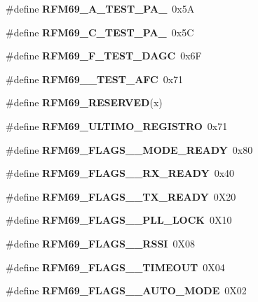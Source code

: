 \begin{DoxyCompactItemize}
\mbox{\label{_r_f_m69__registri_8h_a2d0457a0a694913f308b09ab318b1702}} 
\#define {\bfseries R\+F\+M69\+\_\+A\+\_\+\+T\+E\+S\+T\+\_\+\+P\+A\+\_}~0x5A
\item 
\mbox{\label{_r_f_m69__registri_8h_ae676ddd3d782a119d68b26e19b12e734}} 
\#define {\bfseries R\+F\+M69\+\_\+C\+\_\+\+T\+E\+S\+T\+\_\+\+P\+A\+\_}~0x5C
\item 
\mbox{\label{_r_f_m69__registri_8h_a2d066f097f8fbee89ebef1c79af1666e}} 
\#define {\bfseries R\+F\+M69\+\_\+F\+\_\+\+T\+E\+S\+T\+\_\+\+D\+A\+GC}~0x6F
\item 
\mbox{\label{_r_f_m69__registri_8h_ab98d2b3a5c8fd0d483125aba5d4f88d1}} 
\#define {\bfseries R\+F\+M69\+\_\+\_\+\+T\+E\+S\+T\+\_\+\+A\+FC}~0x71
\item 
\#define {\bfseries R\+F\+M69\+\_\+\+R\+E\+S\+E\+R\+V\+ED}(x)
\item 
\mbox{\label{_r_f_m69__registri_8h_a1e4fd91ba0f4632623d43064e9353bb2}} 
\#define {\bfseries R\+F\+M69\+\_\+\+U\+L\+T\+I\+M\+O\+\_\+\+R\+E\+G\+I\+S\+T\+RO}~0x71
\item 
\mbox{\label{_r_f_m69__registri_8h_a2618848fa50d2dc35e6bc92e2f742278}} 
\#define {\bfseries R\+F\+M69\+\_\+\+F\+L\+A\+G\+S\+\_\+\_\+\+M\+O\+D\+E\+\_\+\+R\+E\+A\+DY}~0x80
\item 
\mbox{\label{_r_f_m69__registri_8h_af72cf9972c71c315dd1bdda894310e37}} 
\#define {\bfseries R\+F\+M69\+\_\+\+F\+L\+A\+G\+S\+\_\+\_\+\+R\+X\+\_\+\+R\+E\+A\+DY}~0x40
\item 
\mbox{\label{_r_f_m69__registri_8h_a1071b53d032ccbe1edae30a85368307c}} 
\#define {\bfseries R\+F\+M69\+\_\+\+F\+L\+A\+G\+S\+\_\+\_\+\+T\+X\+\_\+\+R\+E\+A\+DY}~0\+X20
\item 
\mbox{\label{_r_f_m69__registri_8h_a0b7bc83cdfac38ca16fdec46188d7cec}} 
\#define {\bfseries R\+F\+M69\+\_\+\+F\+L\+A\+G\+S\+\_\+\_\+\+P\+L\+L\+\_\+\+L\+O\+CK}~0\+X10
\item 
\mbox{\label{_r_f_m69__registri_8h_a46b5263c7d18e30696cf6227bcb5951f}} 
\#define {\bfseries R\+F\+M69\+\_\+\+F\+L\+A\+G\+S\+\_\+\_\+\+R\+S\+SI}~0\+X08
\item 
\mbox{\label{_r_f_m69__registri_8h_a084cff8273349aba0a551d8df592f367}} 
\#define {\bfseries R\+F\+M69\+\_\+\+F\+L\+A\+G\+S\+\_\+\_\+\+T\+I\+M\+E\+O\+UT}~0\+X04
\item 
\mbox{\label{_r_f_m69__registri_8h_a9be7fda10e9fb35d7ef5eb419280b86d}} 
\#define {\bfseries R\+F\+M69\+\_\+\+F\+L\+A\+G\+S\+\_\+\_\+\+A\+U\+T\+O\+\_\+\+M\+O\+DE}~0\+X02
\item 

\end{DoxyCompactItemize}
